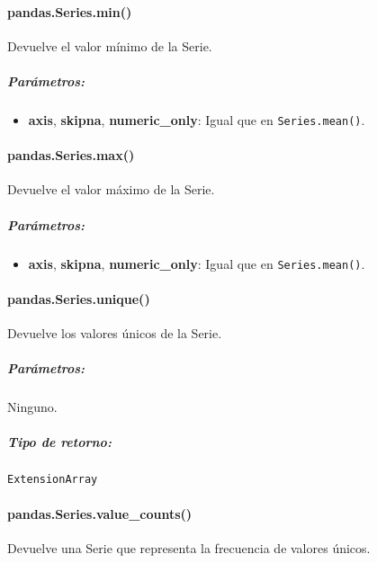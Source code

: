 \paragraph{pandas.Series.min()} Devuelve el valor mínimo de la Serie.

\subparagraph{Parámetros:}
\begin{itemize}
    \item \textbf{axis}, \textbf{skipna}, \textbf{numeric\_only}: Igual que en
          \texttt{Series.mean()}.
\end{itemize}

\paragraph{pandas.Series.max()} Devuelve el valor máximo de la Serie.

\subparagraph{Parámetros:}
\begin{itemize}
    \item \textbf{axis}, \textbf{skipna}, \textbf{numeric\_only}: Igual que en
          \texttt{Series.mean()}.
\end{itemize}

\paragraph{pandas.Series.unique()} Devuelve los valores únicos de la Serie.

\subparagraph{Parámetros:} Ninguno.

\subparagraph{Tipo de retorno:} \texttt{ExtensionArray}

\paragraph{pandas.Series.value\_counts()} Devuelve una Serie que representa la
frecuencia de valores únicos.

